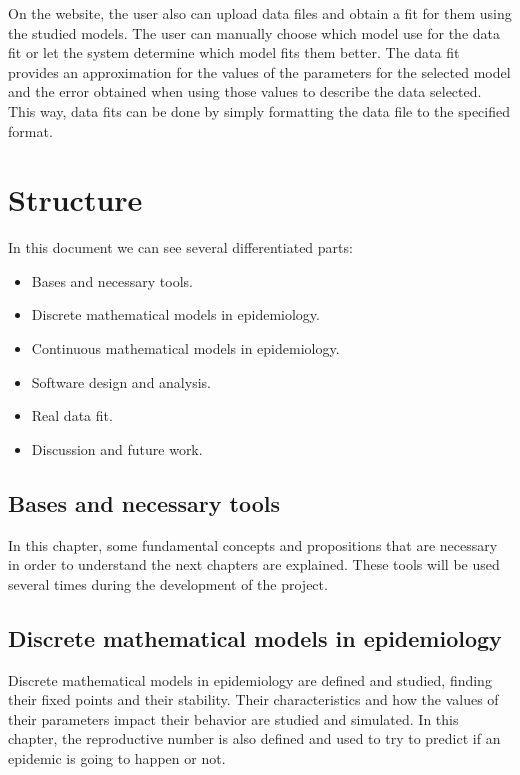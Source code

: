 On the website, the user also can upload data files and obtain a fit for them using the studied models. The user can manually choose which model use for the data fit or let the system determine which model fits them better. The data fit provides an approximation for the values of the parameters for the selected model and the error obtained when using those values to describe the data selected. This way, data fits can be done by simply formatting the data file to the specified format.

\section*{Structure}

In this document we can see several differentiated parts:

\begin{itemize}
\item Bases and necessary tools.
\item Discrete mathematical models in epidemiology.
\item Continuous mathematical models in epidemiology.
\item Software design and analysis.
\item Real data fit.
\item Discussion and future work.
\end{itemize}

\subsection*{Bases and necessary tools}

In this chapter, some fundamental concepts and propositions that are necessary in order to understand the next chapters are explained.  These tools will be used several times during the development of the project.

\subsection*{Discrete mathematical models in epidemiology}

Discrete mathematical models in epidemiology are defined and studied, finding their fixed points and their stability. Their characteristics and how the values of their parameters impact their behavior are studied and simulated. In this chapter, the reproductive number is also defined and used to try to predict if an epidemic is going to happen or not.

